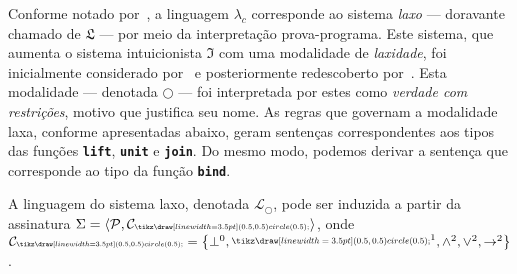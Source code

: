 \vspace{.5\baselineskip}
Conforme notado por~\cite{Benton+others.1998}, a linguagem $\lambda_c$ corresponde ao sistema \emph{laxo} --- doravante chamado de $\mathfrak{L}$ --- por meio da interpretação prova-programa.
Este sistema, que aumenta o sistema intuicionista $\mathfrak{I}$ com uma modalidade de \emph{laxidade}, foi inicialmente considerado por~\cite{Curry.1950, Curry.1952} e posteriormente redescoberto por~\cite{Fairtlough+Mendler.1997}.
Esta modalidade --- denotada $\bigcirc$ --- foi interpretada por estes como \emph{verdade com restrições}, motivo que justifica seu nome.
As regras que governam a modalidade laxa, conforme apresentadas abaixo, geram sentenças correspondentes aos tipos das funções {\texttt{\textbf{lift}}}, {\texttt{\textbf{unit}}} e {\texttt{\textbf{join}}}.
Do mesmo modo, podemos derivar a sentença que corresponde ao tipo da função {\texttt{\textbf{bind}}}.

\vspace{.5\baselineskip}
\begin{tcolorbox}[enhanced jigsaw, breakable, sharp corners, colframe=black, colback=white, boxrule=0.5pt, left=1.5mm, right=1.5mm, top=1.5mm, bottom=1.5mm]
\begin{definition}\label{lax.language}
    A linguagem do sistema laxo, denotada $\mathcal{L}_\bigcirc$, pode ser induzida a partir da assinatura $\Sigma=\sequence{\mathcal{P},\mathcal{C}_\bigcirc}$, onde $\mathcal{C}_\bigcirc=\set{\bot^0,\bigcirc^1,\wedge^2,\vee^2,\to^2}$.
\end{definition}
\end{tcolorbox}

